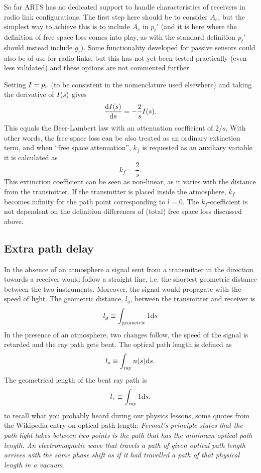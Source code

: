So far ARTS has no dedicated support to handle characteristics of receivers in
radio link configurations. The first step here should be to consider $A_e$, but
the simplest way to achieve this is to include $A_e$ in $p_t'$ (and it is here
where the definition of free space loss comes into play, as with the standard
definition $p_t'$ should instead include $g_r$). Some functionality developed
for passive sensors could also be of use for radio links, but this has not yet
been tested practically (even less validated) and these options are not
commented further.

Setting $I=p_r$ (to be consistent in the nomenclature used elsewhere) and
taking the derivative of \(I(s)\) gives
\begin{equation}
\label{eq:fsplarts}
 \frac{\mathrm{d}I(s)}{\mathrm{d} s}=-\frac{2}{s}I(s).
\end{equation}
This equals the Beer-Lambert law with an attenuation coefficient of $2/s$. With
other words, the free space loss can be also treated as an ordinary extinction
term, and when ``free space attenuation'', $k_f$ is requested as an auxiliary
variable it is calculated as
\begin{equation}
 k_f=\frac{2}{s}.
\end{equation}
This extinction coefficient can be seen as non-linear, as it varies with the
distance from the transmitter. If the transmitter is placed inside the
atmosphere, $k_f$ becomes infinity for the path point corresponding to $l=0$.
The $k_f$-coefficient is not dependent on the definition differences of (total)
free space loss discussed above.


\subsection{Extra path delay}
%
In the absence of an atmosphere a signal sent from a transmitter in the
direction towards a receiver would follow a straight line, i.e. the shortest
geometric distance between the two instruments. Moreover, the signal would
propagate with the speed of light. The geometric distance, $l_g$, between the
transmitter and receiver is
\begin{equation}
l_g\equiv\int_{\mathrm{geometric}}1\mathrm{d} s
\end{equation}
In the presence of an atmosphere, two changes follow,
the speed of the signal is retarded and the ray path gets 
bent. The optical path length is defined as
\begin{equation}
l_o\equiv\int_{\mathrm{ray}}n(s)\mathrm{d} s.
\end{equation}
The geometrical length of the bent ray path is
\begin{equation}
l_r\equiv\int_{\mathrm{ray}}1\mathrm{d} s.
\label{eq:rlink:lr}
\end{equation}
to recall what you probably heard during our physics lessons, some quotes from
the Wikipedia entry on optical path length: \emph{Fermat's principle states
  that the path light takes between two points is the path that has the minimum
  optical path length. An electromagnetic wave that travels a path of given
  optical path length arrives with the same phase shift as if it had travelled
  a path of that physical length in a vacuum.}

